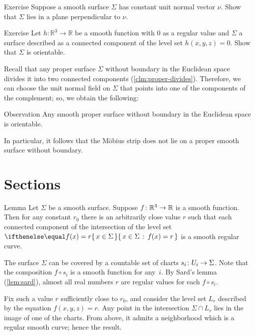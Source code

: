 \begin{thm}{Exercise}\label{ex:const-normal}
Suppose a smooth surface $\Sigma$ has constant unit normal vector $\nu$.
Show that $\Sigma$ lies in a plane perpendicular to $\nu$.
\end{thm}

\begin{thm}{Exercise}\label{ex:implicit-orientable}
Let $h:\mathbb{R}^3\to\mathbb{R}$ be a smooth function with $0$ as a regular value and $\Sigma$ a surface described as a connected component of the level set $h(x,y,z)=0$.
Show that $\Sigma$ is orientable.
\end{thm}

Recall that any proper surface $\Sigma$ without boundary in the Euclidean space divides it into two connected components (\ref{clm:proper-divides}).
Therefore, we can choose the unit normal field on $\Sigma$ that points into one of the components of the complement; so, we obtain the following: 

\begin{thm}{Observation}
Any smooth proper surface without boundary in the Euclidean space is orientable.
\end{thm}

In particular, it follows that the Möbius strip does not lie on a proper smooth surface without boundary.

\section{Sections}

\begin{thm}{Lemma}\label{lem:reg-section}
Let $\Sigma$ be a smooth surface.
Suppose $f\:\mathbb{R}^3\z\to\mathbb{R}$ is a smooth function.
Then for any constant $r_0$ there is an arbitrarily close value $r$ such that 
each connected component of the intersection of the level set $\set{x\in\Sigma}{f(x)=r}$ is a smooth regular curve.
\end{thm}

The surface $\Sigma$ can be covered by a countable set of charts $s_i\:U_i\z\to \Sigma$.
Note that the composition $f\circ s_i$ is a smooth function for any~$i$.
By Sard's lemma (\ref{lem:sard}), almost all real numbers $r$ are regular values for each $f\circ s_i$.

Fix such a value $r$ sufficiently close to $r_0$, and consider the level set $L_r$ described by the equation $f(x,y,z)=r$.
Any point in the intersection $\Sigma\cap L_r$ lies in the image of one of the charts.
From above, it admits a neighborhood which is a regular smooth curve;
hence the result.\qeds

